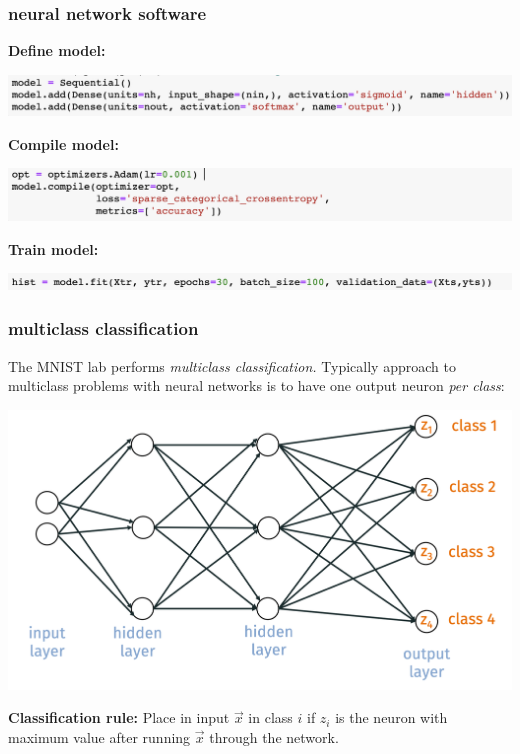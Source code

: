 \documentclass[handout,compress]{beamer}
\begin{document}
	\begin{frame}
		\frametitle{neural network software}
		\small
		\textbf{Define model:}
		\begin{center}
			\includegraphics[width=\textwidth]{define_model.png}
		\end{center}
		\vspace{-1em}
		
		\textbf{Compile model:}
		\begin{center}
		\includegraphics[width=\textwidth]{compile_model.png}
		\end{center}
		\vspace{-1em}
		
		\textbf{Train model:}
		\begin{center}
		\includegraphics[width=\textwidth]{runmodel.png}
		\end{center}
		\vspace{-1em}
	\end{frame}

	\begin{frame}
	\frametitle{multiclass classification}
	The MNIST lab performs \emph{multiclass classification.} Typically approach to multiclass problems with neural networks is to have one output neuron \emph{per class}:
	\begin{center}
		\includegraphics[width=.8\textwidth]{multiclass_network.png}
	\end{center}
	
	\vspace{-1.5em}
	\textbf{Classification rule:} Place in input $\vec{x}$ in class $i$ if $z_i$ is the neuron with maximum value after running $\vec{x}$ through the network.
	\end{frame}
\end{document}
